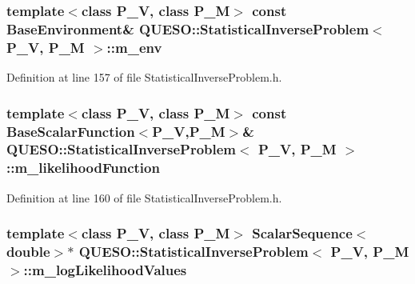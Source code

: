 \hypertarget{class_q_u_e_s_o_1_1_statistical_inverse_problem_ac24b3395274db9fad21b13abd2d070d1}{
\subsubsection[{m\-\_\-env}]{\setlength{\rightskip}{0pt plus 5cm}template$<$class P\-\_\-\-V, class P\-\_\-\-M$>$ const {\bf Base\-Environment}\& {\bf Q\-U\-E\-S\-O\-::\-Statistical\-Inverse\-Problem}$<$ P\-\_\-\-V, P\-\_\-\-M $>$\-::m\-\_\-env\hspace{0.3cm}{\ttfamily [private]}}}\label{class_q_u_e_s_o_1_1_statistical_inverse_problem_ac24b3395274db9fad21b13abd2d070d1}


Definition at line 157 of file Statistical\-Inverse\-Problem.\-h.

\hypertarget{class_q_u_e_s_o_1_1_statistical_inverse_problem_a27177c077988c85c3310e0491f899332}{
\subsubsection[{m\-\_\-likelihood\-Function}]{\setlength{\rightskip}{0pt plus 5cm}template$<$class P\-\_\-\-V, class P\-\_\-\-M$>$ const {\bf Base\-Scalar\-Function}$<$P\-\_\-\-V,P\-\_\-\-M$>$\& {\bf Q\-U\-E\-S\-O\-::\-Statistical\-Inverse\-Problem}$<$ P\-\_\-\-V, P\-\_\-\-M $>$\-::m\-\_\-likelihood\-Function\hspace{0.3cm}{\ttfamily [private]}}}\label{class_q_u_e_s_o_1_1_statistical_inverse_problem_a27177c077988c85c3310e0491f899332}


Definition at line 160 of file Statistical\-Inverse\-Problem.\-h.

\hypertarget{class_q_u_e_s_o_1_1_statistical_inverse_problem_a7138a1175f641633f69ab90617fc5f8c}{
\subsubsection[{m\-\_\-log\-Likelihood\-Values}]{\setlength{\rightskip}{0pt plus 5cm}template$<$class P\-\_\-\-V, class P\-\_\-\-M$>$ {\bf Scalar\-Sequence}$<$double$>$$\ast$ {\bf Q\-U\-E\-S\-O\-::\-Statistical\-Inverse\-Problem}$<$ P\-\_\-\-V, P\-\_\-\-M $>$\-::m\-\_\-log\-Likelihood\-Values\hspace{0.3cm}{\ttfamily [private]}}}\label{class_q_u_e_s_o_1_1_statistical_inverse_problem_a7138a1175f641633f69ab90617fc5f8c}


